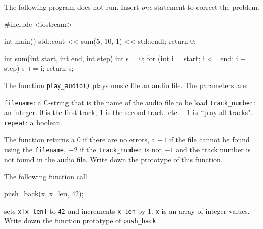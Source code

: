 

\nextq
The following program does not run.
Insert \textit{one} statement to correct the problem.
\\
\ANSWER
\begin{answercode}
#include <iostream>

int main()
{
    std::cout << sum(5, 10, 1) << std::endl;
    return 0;
}

int sum(int start, int end, int step)
{
    int s = 0;
    for (int i = start; i <= end; i += step)
    {
        s += i;
    }
    return s;
}
\end{answercode}

\nextq
The function \verb!play_audio()! plays music file an audio file. The parameters are:
\begin{enumerate}[nosep]
\li \verb!filename!: a C-string that is the name of the audio file to be load
\li \verb!track_number!: an integer.
$0$ is the first track, $1$ is the second track, etc.
$-1$ is \lq\lq play all tracks".
\li \verb!repeat!: a boolean.
\end{enumerate}
The function returns a $0$ if there are no errors,
a $-1$ if the file cannot be found using the \verb!filename!,
$-2$ if the \verb!track_number! is not $-1$ and the track number is not found
in the audio file.
Write down the prototype of this function.
\\
\ANSWER
\begin{answercode}

\end{answercode}

\nextq
The following function call
\begin{console}
push_back(x, x_len, 42);
\end{console}
sets \verb!x[x_len]! to \verb!42! and increments \verb!x_len! by 1.
\verb!x! is an array of integer values.
Write down the function prototype of \verb!push_back!.
\\
\ANSWER
\begin{answercode}

\end{answercode}

